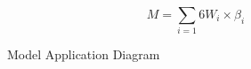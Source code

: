 \begin{equation} \label{1}
    M=\sum_{i=1}{6}W_{i}\times\beta _{i}
\end{equation}

\begin{figure}[htbp]
    \centering
    \vspace{-0.15in}
    
    \begin{minipage}{1\linewidth}
        \hfill %
    \end{minipage}
    
    \vskip -0.3cm
    
    \begin{minipage}{1\linewidth}
        \hfill %
    \end{minipage}
    
    \vspace{-0.18in}
    
    \caption{Model Application Diagram} \label{fig:8-11}
\end{figure}

